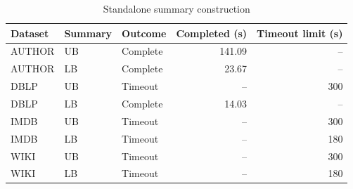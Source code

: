\begin{table}[H]
\centering
\small
\setlength{\tabcolsep}{5pt}
\caption{Standalone summary construction}
\label{tab:E_summary_components}
\begin{tabular}{@{}lllrr@{}}
\toprule
Dataset & Summary & Outcome & Completed (s) & Timeout limit (s) \\
\midrule
AUTHOR & UB & Complete & 141.09 & -- \\
AUTHOR & LB & Complete & 23.67 & -- \\
DBLP & UB & Timeout & -- & 300 \\
DBLP & LB & Complete & 14.03 & -- \\
IMDB & UB & Timeout & -- & 300 \\
IMDB & LB & Timeout & -- & 180 \\
WIKI & UB & Timeout & -- & 300 \\
WIKI & LB & Timeout & -- & 180 \\
\bottomrule
\end{tabular}
\end{table}
